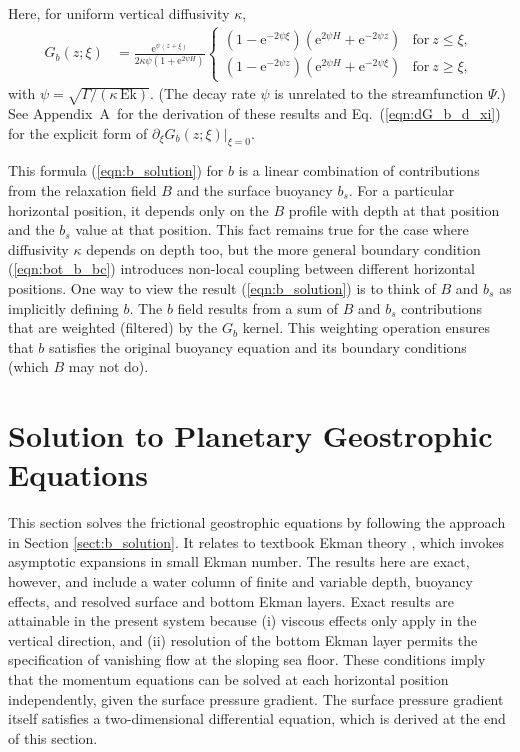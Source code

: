 \documentclass{ametsocV6.2}
\newcommand{\appbEqnSoln}{Appendix~A}
\begin{document}
Here, for uniform vertical diffusivity $\kappa$,
\begin{align}
G_b (z; \xi) & = \frac{\mathrm{e}^{\psi \left(z + \xi\right)}}
{2 \kappa \psi \left(1 + \mathrm{e}^{2 \psi H } \right)}
\begin{cases} 
\displaystyle \left(1 - \mathrm{e}^{- 2 \psi \xi} \right) \left(\mathrm{e}^{2 \psi H} + \mathrm{e}^{- 2 \psi z  }\right) & \text{for}\: z \leq \xi , \\
\displaystyle \left(1 - \mathrm{e}^{- 2 \psi   z} \right) \left(\mathrm{e}^{2 \psi H} + \mathrm{e}^{- 2 \psi \xi}\right) & \text{for}\: z \geq \xi ,
\end{cases}
\label{eqn:b_Greens_fn}
\end{align}
with $\psi = \sqrt{\Gamma / (\kappa \, \mathrm{Ek})}$. (The decay rate $\psi$ is unrelated to the streamfunction $\Psi$.) 
See \appbEqnSoln\ for the derivation of these results and Eq.~(\ref{eqn:dG_b_d_xi}) for the explicit form of $\partial_\xi G_b(z;\xi) |_{\xi = 0}$.

This formula (\ref{eqn:b_solution}) for $b$ is a linear combination of contributions from the relaxation field $B$ and the surface buoyancy $b_s$.
For a particular horizontal position, it depends only on the $B$ profile with depth at that position and the $b_s$ value at that position.
This fact remains true for the case where diffusivity $\kappa$ depends on depth too, but the more general boundary condition (\ref{eqn:bot_b_bc}) introduces non-local coupling between different horizontal positions.
One way to view the result (\ref{eqn:b_solution}) is to think of $B$ and $b_s$ as implicitly defining $b$.
The $b$ field results from a sum of $B$ and $b_s$ contributions that are weighted (filtered) by the $G_b$ kernel.
This weighting operation ensures that $b$ satisfies the original buoyancy equation and its boundary conditions (which $B$ may not do).


\section{Solution to Planetary Geostrophic Equations}
\label{sect:PG_soln}
This section solves the frictional geostrophic equations by following the approach in Section \ref{sect:b_solution}.
It relates to textbook Ekman theory \citep{ekman05,greenspan90,salmon98,vallis06}, which invokes asymptotic expansions in small Ekman number.
The results here are exact, however, and include a water column of finite and variable depth,  buoyancy effects, and resolved surface and bottom Ekman layers.
Exact results are attainable in the present system because (i) viscous effects only apply in the vertical direction, and (ii) resolution of the bottom Ekman layer permits the specification of vanishing flow at the sloping sea floor.
These conditions imply that the momentum equations can be solved at each horizontal position independently, given the surface pressure gradient.
The surface pressure gradient itself satisfies a two-dimensional differential equation, which is derived at the end of this section.
\end{document}
